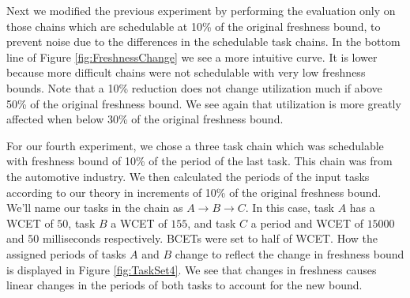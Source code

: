 Next we modified the previous experiment by performing the evaluation only on those chains which are schedulable at 10\% of the original freshness bound, to prevent noise due to the differences in the schedulable task chains. In the bottom line of Figure \ref{fig:FreshnessChange} we see a more intuitive curve. It is lower because more difficult chains were not schedulable with very low freshness bounds. Note that a 10\% reduction does not change utilization much if above 50\% of the original freshness bound. We see again that utilization is more greatly affected when below 30\% of the original freshness bound.

\iffalse
\begin{figure}[h]
	\centering
	\begin{tikzpicture}[thick,scale=.8, every node/.style={scale=.8}]
	\begin{axis}[
	title={Schedulability/Freshness Tradeoff: Part 2},
	xlabel={Freshness Bound [\% of Original]},
	ylabel={Utilization},
	xmin=10, xmax=100,
	ymin=0, ymax=30,
	ytick={0,5,10,15,20,25,30},
	xtick={10,20,30,40,50,60,70,80,90,100},
	xticklabels={100,90,80,70,60,50,40,30,20,10},
	legend pos=north west,
	ymajorgrids=true,
	xmajorgrids=true,
	grid style=dashed,
	]
	
	\addplot[
	color=blue,
	mark=square,
	]
	coordinates {
		(100,23.6)(90,11.9)(80,8)(70,6)(60,4.9)(50,4.1)(40,3.5)(30,3.1)(20,2.8)(10,2.5)
	};
	
	\legend{Utilization}
	\end{axis}
	\end{tikzpicture}
	\caption{Freshness vs. Utilization. Result for task chains that remain schedulable even with a freshness bound 10\% of the consuming task's period.}
	\label{fig:FreshnessChangeControlled}
\end{figure}
\fi

For our fourth experiment, we chose a three task chain which was schedulable with freshness bound of 10\% of the period of the last task. This chain was from the automotive industry. We then calculated the periods of the input tasks according to our theory in increments of 10\% of the original freshness bound. We'll name our tasks in the chain as $A \to B \to C$. In this case, task $A$ has a WCET of $50$, task $B$ a WCET of $155$, and task $C$ a period and WCET of $15000$ and $50$ milliseconds respectively. BCETs were set to half of WCET. How the assigned periods of tasks $A$ and $B$ change to reflect the change in freshness bound is displayed in Figure \ref{fig:TaskSet4}. We see that changes in freshness causes linear changes in the periods of both tasks to account for the new bound.

